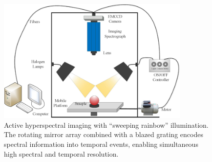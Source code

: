 \documentclass[conference]{IEEEtran}
\begin{document}
\begin{figure}[!t]
\centering
\includegraphics[width=0.85\textwidth]{The-schematic-of-the-hyperspectral-imaging-system.png}
\caption{Active hyperspectral imaging with “sweeping rainbow” illumination. The rotating mirror array combined with a blazed grating encodes spectral information into temporal events, enabling simultaneous high spectral and temporal resolution.}
\label{fig:sweeping_rainbow}
\end{figure}
\end{document}
